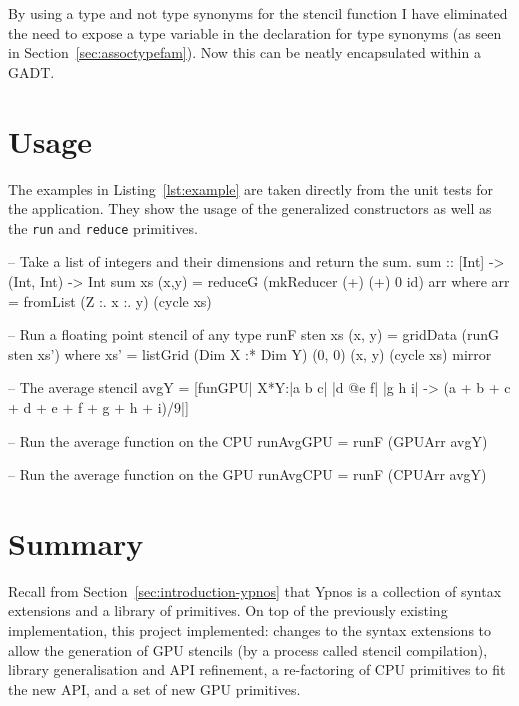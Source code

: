 \documentclass[
    12pt,
    a4paper,
    twoside,
    openright,
    ]{scrbook}
\begin{document}
By using a type and not type synonyms for the stencil function I have eliminated
the need to expose a type variable in the declaration for type synonyms (as seen
in Section~\ref{sec:assoctypefam}). Now this can be neatly encapsulated within a
GADT.

\section{Usage}
\label{sec:usage}

The examples in Listing~\ref{lst:example} are taken directly from the unit tests
for the application. They show the usage of the generalized constructors as well
as the \texttt{run} and \texttt{reduce} primitives.

\begin{hflisting}[label=lst:example,
caption=Usage of the final system taken from the unit tests.]

-- Take a list of integers and their dimensions and return the sum.
sum :: [Int] -> (Int, Int) -> Int
sum xs (x,y) =  reduceG (mkReducer (+) (+) 0 id) arr
    where arr = fromList (Z :. x :. y) (cycle xs)

-- Run a floating point stencil of any type
runF sten xs (x, y) = gridData (runG sten xs')
    where xs' = listGrid (Dim X :* Dim Y)
                         (0, 0) (x, y)
                         (cycle xs)
                         mirror

-- The average stencil
avgY = [funGPU| X*Y:|a  b c|
                    |d @e f|
                    |g  h i| ->
        (a + b + c + d + e + f + g + h + i)/9|]

-- Run the average function on the CPU
runAvgGPU = runF (GPUArr avgY)

-- Run the average function on the GPU
runAvgCPU = runF (CPUArr avgY)

\end{hflisting}

\section{Summary}

Recall from Section~\ref{sec:introduction-ypnos} that Ypnos is a collection of
syntax extensions and a library of primitives. On top of the previously existing
implementation, this project implemented: changes to the syntax extensions to
allow the generation of GPU stencils (by a process called stencil compilation),
library generalisation and API refinement, a re-factoring of CPU primitives to
fit the new API, and a set of new GPU primitives.
\end{document}
